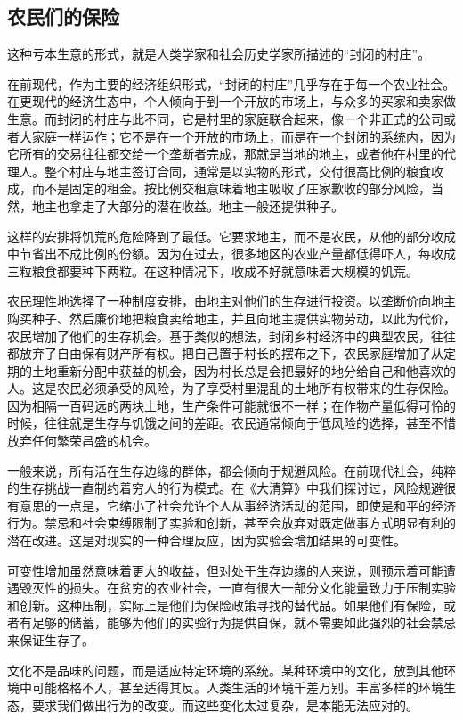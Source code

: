 \subsection{农民们的保险}
这种亏本生意的形式，就是人类学家和社会历史学家所描述的“封闭的村庄”。

在前现代，作为主要的经济组织形式，“封闭的村庄”几乎存在于每一个农业社会。在更现代的经济生态中，个人倾向于到一个开放的市场上，与众多的买家和卖家做生意。而封闭的村庄与此不同，它是村里的家庭联合起来，像一个非正式的公司或者大家庭一样运作；它不是在一个开放的市场上，而是在一个封闭的系统内，因为它所有的交易往往都交给一个垄断者完成，那就是当地的地主，或者他在村里的代理人。整个村庄与地主签订合同，通常是以实物的形式，交付很高比例的粮食收成，而不是固定的租金。按比例交租意味着地主吸收了庄家歉收的部分风险，当然，地主也拿走了大部分的潜在收益。地主一般还提供种子。

这样的安排将饥荒的危险降到了最低。它要求地主，而不是农民，从他的部分收成中节省出不成比例的份额。因为在过去，很多地区的农业产量都低得吓人，每收成三粒粮食都要种下两粒。在这种情况下，收成不好就意味着大规模的饥荒。

农民理性地选择了一种制度安排，由地主对他们的生存进行投资。以垄断价向地主购买种子、然后廉价地把粮食卖给地主，并且向地主提供实物劳动，以此为代价，农民增加了他们的生存机会。基于类似的想法，封闭乡村经济中的典型农民，往往都放弃了自由保有财产所有权。把自己置于村长的摆布之下，农民家庭增加了从定期的土地重新分配中获益的机会，因为村长总是会把最好的地分给自己和他喜欢的人。这是农民必须承受的风险，为了享受村里混乱的土地所有权带来的生存保险。因为相隔一百码远的两块土地，生产条件可能就很不一样；在作物产量低得可怜的时候，往往就是生存与饥饿之间的差距。农民通常倾向于低风险的选择，甚至不惜放弃任何繁荣昌盛的机会。

一般来说，所有活在生存边缘的群体，都会倾向于规避风险。在前现代社会，纯粹的生存挑战一直制约着穷人的行为模式。在《大清算》中我们探讨过，风险规避很有意思的一点是，它缩小了社会允许个人从事经济活动的范围，即使是和平的经济行为。禁忌和社会束缚限制了实验和创新，甚至会放弃对既定做事方式明显有利的潜在改进。这是对现实的一种合理反应，因为实验会增加结果的可变性。

可变性增加虽然意味着更大的收益，但对处于生存边缘的人来说，则预示着可能遭遇毁灭性的损失。在贫穷的农业社会，一直有很大一部分文化能量致力于压制实验和创新。这种压制，实际上是他们为保险政策寻找的替代品。如果他们有保险，或者有足够的储蓄，能够为他们的实验行为提供自保，就不需要如此强烈的社会禁忌来保证生存了。

文化不是品味的问题，而是适应特定环境的系统。某种环境中的文化，放到其他环境中可能格格不入，甚至适得其反。人类生活的环境千差万别。丰富多样的环境生态，要求我们做出行为的改变。而这些变化太过复杂，是本能无法应对的。

